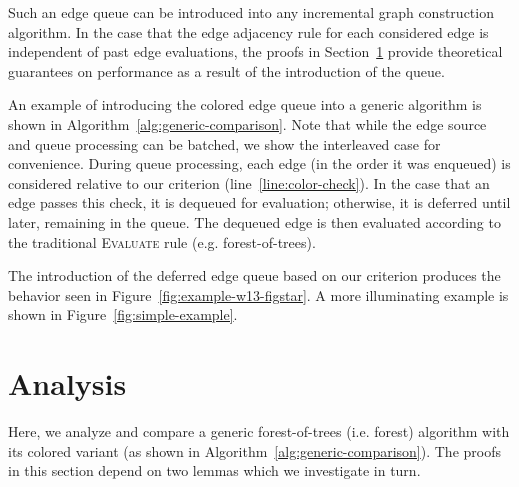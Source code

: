 Such an edge queue can be introduced into any incremental graph construction
algorithm.
In the case that the edge adjacency rule for each considered edge
is independent of past edge evaluations,
the proofs in Section~\ref{sec:analysis} provide theoretical guarantees
on performance as a result of the introduction of the queue.

An example of introducing the colored edge queue into a generic algorithm
is shown in Algorithm~\ref{alg:generic-comparison}.
Note that while the edge source and queue processing can be batched,
we show the interleaved case for convenience.
During queue processing,
each edge (in the order it was enqueued)
is considered relative to our criterion (line~\ref{line:color-check}).
In the case that an edge passes this check,
it is dequeued for evaluation;
otherwise, it is deferred until later, remaining in the queue.
The dequeued edge is then evaluated according to the traditional
\textsc{Evaluate} rule (e.g. forest-of-trees).

The introduction of the deferred edge queue based on our criterion
produces the behavior seen in Figure~\ref{fig:example-w13-figstar}.
A more illuminating example is shown in
Figure~\ref{fig:simple-example}.

\section{Analysis}
\label{sec:analysis}

Here, we analyze and compare a generic forest-of-trees (i.e. forest)
algorithm with its colored variant
(as shown in Algorithm~\ref{alg:generic-comparison}).
The proofs in this section depend on two lemmas which we investigate
in turn.

